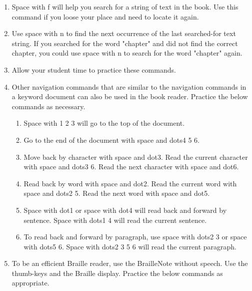 \documentclass[10pt,letterpaper,twoside]{report}
\begin{document}
{{{{\begin{enumerate}
	\item Space with f will help you search for a string of text in the book. Use this command if you loose your place and need to locate it again.
	      
	\item Use space with n to find the next occurrence of the last searched-for text string.  If you searched for the word "chapter" and did not find the correct chapter, you could use space with n to search for the word "chapter" again.
	      
	\item Allow your student time to practice these commands.
	      
	\item Other navigation commands that are similar to the navigation commands in a keyword document can also be used in the book reader.  Practice the below commands as necessary.
	      
	      \begin{enumerate}
		      \item Space with 1 2 3 will go to the top of the document.
		            
		      \item Go to the end of the document with space and dots4 5 6.
		            
		      \item Move back by character with space and dot3. Read the current character with space and dots3 6.  Read the next character with space and dot6.
		            
		      \item Read back by word with space and dot2. Read the current word with space and dots2 5.  Read the next word with space and dot5.
		            
		      \item Space with dot1 or space with dot4 will read back and forward by sentence.  Space with dots1 4 will read the current sentence.
		            
		      \item To read back and forward by paragraph, use space with dots2 3 or space with dots5 6.  Space with dots2 3 5 6 will read the current paragraph.
		            
		            
		            
		            
	      \end{enumerate}
	\item To be an efficient Braille reader, use the BrailleNote without speech.  Use the thumb-keys and the Braille display.  Practice the below commands as appropriate.
	      

\end{enumerate}}}}}
\end{document}
